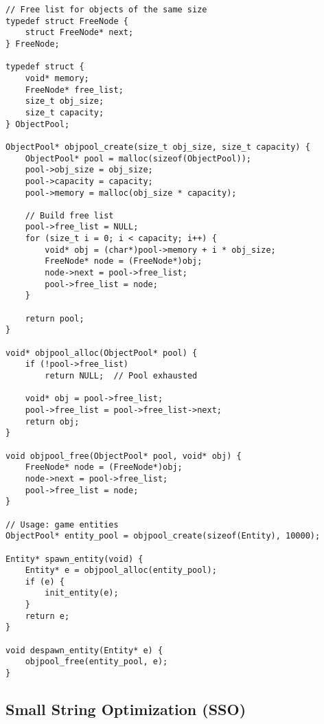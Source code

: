 \begin{lstlisting}
// Free list for objects of the same size
typedef struct FreeNode {
    struct FreeNode* next;
} FreeNode;

typedef struct {
    void* memory;
    FreeNode* free_list;
    size_t obj_size;
    size_t capacity;
} ObjectPool;

ObjectPool* objpool_create(size_t obj_size, size_t capacity) {
    ObjectPool* pool = malloc(sizeof(ObjectPool));
    pool->obj_size = obj_size;
    pool->capacity = capacity;
    pool->memory = malloc(obj_size * capacity);

    // Build free list
    pool->free_list = NULL;
    for (size_t i = 0; i < capacity; i++) {
        void* obj = (char*)pool->memory + i * obj_size;
        FreeNode* node = (FreeNode*)obj;
        node->next = pool->free_list;
        pool->free_list = node;
    }

    return pool;
}

void* objpool_alloc(ObjectPool* pool) {
    if (!pool->free_list)
        return NULL;  // Pool exhausted

    void* obj = pool->free_list;
    pool->free_list = pool->free_list->next;
    return obj;
}

void objpool_free(ObjectPool* pool, void* obj) {
    FreeNode* node = (FreeNode*)obj;
    node->next = pool->free_list;
    pool->free_list = node;
}

// Usage: game entities
ObjectPool* entity_pool = objpool_create(sizeof(Entity), 10000);

Entity* spawn_entity(void) {
    Entity* e = objpool_alloc(entity_pool);
    if (e) {
        init_entity(e);
    }
    return e;
}

void despawn_entity(Entity* e) {
    objpool_free(entity_pool, e);
}
\end{lstlisting}

\subsection{Small String Optimization (SSO)}

